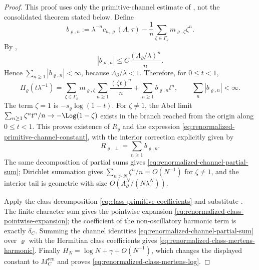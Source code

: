\begin{proof}
  This proof uses only the primitive-channel estimate of
  , not the
  consolidated theorem stated below.  Define
  \begin{equation}\label{eq:renormalized-channel-error-b}
    b_{\varrho,n}:=
    \lambda^{-n}c_{n,\varrho}(A,\tau)
    -\frac1n
      \sum_{\zeta\in\Gamma_\varrho}
        m_{\varrho,\zeta}\zeta^n .
  \end{equation}
  By ,
  \[
    |b_{\varrho,n}|
    \le
    C\frac{(\Lambda_\partial/\lambda)^n}{n}.
  \]
  Hence \(\sum_{n\ge1}|b_{\varrho,n}|<\infty\), because
  \(\Lambda_\partial/\lambda<1\).  Therefore, for \(0\le t<1\),
  \[
    \Pi_\varrho(t\lambda^{-1})
    =
    \sum_{\zeta\in\Gamma_\varrho}
      m_{\varrho,\zeta}\sum_{n\ge1}\frac{(\zeta t)^n}{n}
    +\sum_{n\ge1}b_{\varrho,n}t^n,
    \qquad
    \sum_n|b_{\varrho,n}|<\infty .
  \]
  The term \(\zeta=1\) is \(-s_\varrho\log(1-t)\).  For
  \(\zeta\ne1\), the Abel limit
  \(\sum_{n\ge1}\zeta^n t^n/n\to-\Log(1-\zeta)\) exists in the branch
  reached from the origin along \(0\le t<1\).  This proves existence of
  \(R_\varrho\) and the expression
  \eqref{eq:renormalized-primitive-channel-constant}, with the interior
  correction explicitly given by
  \[
    R_{\varrho,\perp}=\sum_{n\ge1}b_{\varrho,n}.
  \]
  The same decomposition of partial sums gives
  \eqref{eq:renormalized-channel-partial-sum}; Dirichlet summation gives
  \(\sum_{n>N}\zeta^n/n=O(N^{-1})\) for \(\zeta\ne1\), and the interior tail
  is geometric with size \(O(\Lambda_\partial^N/(N\lambda^N))\).

  Apply the class decomposition
  \eqref{eq:class-primitive-coefficients} and substitute
  .  The finite character
  sum gives the pointwise expansion
  \eqref{eq:renormalized-class-pointwise-expansion}; the coefficient of
  the non-oscillatory harmonic term is exactly
  \(\delta_C\).  Summing the channel identities
  \eqref{eq:renormalized-channel-partial-sum} over
  \(\varrho\) with the Hermitian class coefficients gives
  \eqref{eq:renormalized-class-mertens-harmonic}.  Finally
  \(H_N=\log N+\gamma+O(N^{-1})\), which changes the displayed constant to
  \(M_C^{\mathrm{ren}}\) and proves
  \eqref{eq:renormalized-class-mertens-log}.
\end{proof}

